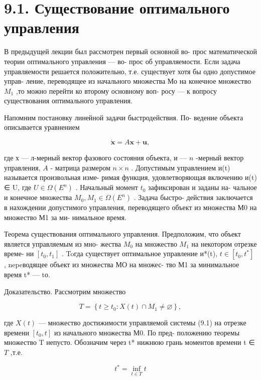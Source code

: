 \documentclass[8pt]{extarticle}
\begin{document}
\section*{9.1. Существование оптимального управления}

В предыдущей лекции был рассмотрен первый основной во- прос математической теории оптимального управления — во- прос об управляемости. Если задача управляемости решается положительно, т.е. существует хотя бы одно допустимое управ- ление, переводящее из начального множества Мо на конечное множество \({M}_{1}\) ,то можно перейти ко второму основному воп- росу — к вопросу существования оптимального управления.

Напомним постановку линейной задачи быстродействия. По- ведение объекта описывается уравнением

\[
\dot{\mathbf{x}} = A\mathbf{x} + \mathbf{u}, \tag{9.1}
\]

где х — л-мерный вектор фазового состояния объекта, и — \(n\) -мерный вектор управления, \(A\) - матрица размером \(n \times  n\) . Допустимым управлением и(t) называется произвольная изме- римая функция, удовлетворяющая включению и(t) ∈ U, где \(U \in  \Omega \left( {E}^{n}\right)\) . Начальный момент \({t}_{0}\) зафиксирован и заданы на- чальное и конечное множества \({M}_{0},{M}_{1} \in  \Omega \left( {E}^{n}\right)\) . Задача быстро- действия заключается в нахождении допустимого управления, переводящего объект из множества М0 на множество М1 за ми- нимальное время.

Теорема существования оптимального управления. Предположим, что объект является управляемым из мно- жества \({M}_{0}\) на множество \({M}_{1}\) на некотором отрезке време- ни \(\left\lbrack  {{t}_{0},{t}_{1}}\right\rbrack\) . Toгда существует оптимальное управление и*(t), \(t \in  \left\lbrack  {{t}_{0},{t}^{ * }}\right\rbrack\) , nepeводящее объект из множества МО на множес- тво М1 за минимальное время t* — tо.

Доказательство. Рассмотрим множество

\[
T = \left\{  {t \geq  {t}_{0} : X\left( t\right)  \cap  {M}_{1} \neq  \varnothing }\right\}  ,
\]

где \(X\left( t\right)\) — множество достижимости управляемой системы (9.1) на отрезке времени \(\left\lbrack  {{t}_{0},t}\right\rbrack\) из начального множества М0. По пред- положению теоремы множество T непусто. Обозначим через t* нижнюю грань моментов времени t ∈ \(T\) ,т.е.

\[
{t}^{ * } = \mathop{\inf }\limits_{{t \in  T}}t
\]
\end{document}
